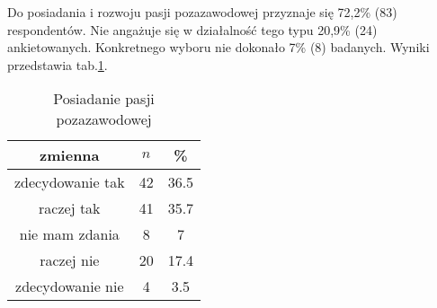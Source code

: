 
Do posiadania i rozwoju pasji pozazawodowej przyznaje się 72,2\% (83) respondentów. Nie angażuje się w działalność tego typu 20,9\% (24) ankietowanych. Konkretnego wyboru nie dokonało 7\% (8) badanych. Wyniki przedstawia  tab.\ref{tab:Q23}.




\begin{table}[H]
\caption{Posiadanie pasji pozazawodowej}
\centering
\begin{tabular}{ | c | c | c |}
\hline
zmienna & $n$ & \% \\
\hline
zdecydowanie tak  &  42  & 36.5\\
\hline
raczej tak  &  41  & 35.7\\
\hline
nie mam zdania  &  8  & 7 \\
\hline
raczej nie  &  20  & 17.4 \\
\hline
zdecydowanie nie  &  4  & 3.5\\
\hline
\end{tabular}
\label{tab:Q23}
\end{table}
